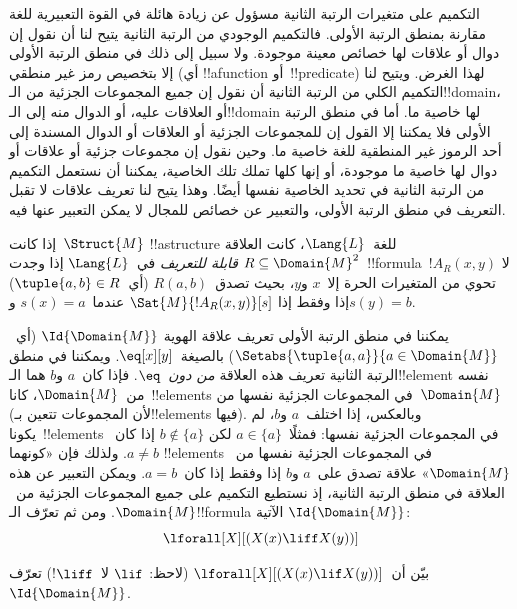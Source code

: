 \documentclass[../../../include/open-logic-section]{subfiles}
\begin{document}

\begin{explain}
التكميم على متغيرات الرتبة الثانية مسؤول عن زيادة هائلة في القوة
التعبيرية للغة مقارنة بمنطق الرتبة الأولى. فالتكميم الوجودي من الرتبة
الثانية يتيح لنا أن نقول إن دوال أو علاقات لها خصائص معينة موجودة. ولا
سبيل إلى ذلك في منطق الرتبة الأولى إلا بتخصيص رمز غير منطقي (أي
!!a{function} أو~!!{predicate}) لهذا الغرض. ويتيح لنا التكميم الكلي
من الرتبة الثانية أن نقول إن جميع المجموعات الجزئية من الـ!!{domain}،
أو العلاقات عليه، أو الدوال منه إلى الـ!!{domain} لها خاصية ما. أما في
منطق الرتبة الأولى فلا يمكننا إلا القول إن للمجموعات الجزئية أو
العلاقات أو الدوال المسندة إلى أحد الرموز غير المنطقية للغة خاصية ما.
وحين نقول إن مجموعات جزئية أو علاقات أو دوال لها خاصية ما موجودة، أو
إنها كلها تملك تلك الخاصية، يمكننا أن نستعمل التكميم من الرتبة الثانية
في تحديد الخاصية نفسها أيضًا. وهذا يتيح لنا تعريف علاقات لا تقبل
التعريف في منطق الرتبة الأولى، والتعبير عن خصائص للمجال لا يمكن التعبير
عنها فيه.
\end{explain}

\begin{defn}
إذا كانت~$\Struct{M}$ !!a{structure} للغة~$\Lang{L}$، كانت العلاقة
$R \subseteq \Domain{M}^2$ \emph{قابلة للتعريف} في~$\Lang{L}$ إذا
وجدت~!!{formula}~$!A_R(x, y)$ لا تحوي من المتغيرات الحرة إلا~$x$
و$y$، بحيث تصدق~$R(a, b)$ (أي~$\tuple{a,b} \in R$) إذا وفقط إذا
$\Sat{M}{!A_R(x, y)}[s]$ عندما~$s(x) = a$ و$s(y) = b$.
\end{defn}

\begin{ex}
يمكننا في منطق الرتبة الأولى تعريف علاقة الهوية
$\Id{\Domain{M}}$ (أي~$\Setabs{\tuple{a,a}}{a \in
  \Domain{M}}$) بالصيغة~$\eq[x][y]$. ويمكننا في منطق الرتبة الثانية
تعريف هذه العلاقة \emph{من دون~$\eq$}. فإذا كان~$a$ و$b$ هما
الـ!!{element} نفسه من~$\Domain{M}$، كانا~!!{element}s في المجموعات
الجزئية نفسها من~$\Domain{M}$ (لأن المجموعات تتعين بـ!!{element}s
فيها). وبالعكس، إذا اختلف~$a$ و$b$، لم يكونا~!!{element}s في
المجموعات الجزئية نفسها: فمثلًا~$a \in \{a\}$ لكن
$b \notin \{a\}$ إذا كان~$a \neq b$. ولذلك فإن «كونهما
!!{element}s في المجموعات الجزئية نفسها من~$\Domain{M}$» علاقة تصدق
على~$a$ و$b$ إذا وفقط إذا كان~$a = b$. ويمكن التعبير عن هذه العلاقة
في منطق الرتبة الثانية، إذ نستطيع التكميم على جميع المجموعات الجزئية
من~$\Domain{M}$. ومن ثم تعرّف الـ!!{formula} الآتية
$\Id{\Domain{M}}$:
\[
\lforall[X][(X(x) \liff X(y))]
\]
\end{ex}

\begin{prob}
بيّن أن~$\lforall[X][(X(x) \lif X(y))]$ (لاحظ: $\lif$ لا~$\liff$!)
تعرّف~$\Id{\Domain{M}}$.
\end{prob}
\end{document}
